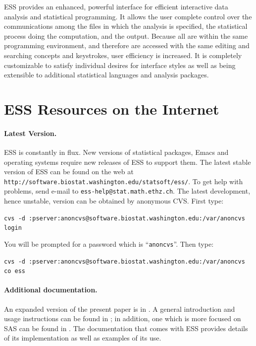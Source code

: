 \documentclass{article}
\def\url#1{\stexttt{#1}} %
\newcommand{\stexttt}[1]{{\small\texttt{#1}}}
\begin{document}
ESS provides 
an enhanced, powerful interface for efficient interactive data
analysis and statistical programming.  
It allows the user complete control over the communications among the
files in which the analysis is specified, the statistical process doing
the computation, and the output.  Because all are within the same programming
environment, and therefore are accessed with the same
editing and searching concepts and keystrokes, user efficiency is increased.
It is completely customizable
to satisfy individual desires for interface styles as well as being
extensible to additional statistical languages and analysis packages.


\section*{ESS Resources on the Internet}
\label{sec:access}
\paragraph{Latest Version.}
ESS is constantly in flux.  New versions of statistical
packages, Emacs and operating systems require new releases of ESS to
support them.  The latest stable version of ESS can be found on the web at
\url{http://software.biostat.washington.edu/statsoft/ess/}.  To get help
with problems, send e-mail to \url{ess-help@stat.math.ethz.ch}.
The latest development, hence unstable, version can be obtained by
anonymous CVS.  First type:

  \stexttt{cvs -d :pserver:anoncvs@software.biostat.washington.edu:/var/anoncvs login}

  You will be prompted for a password which is ``\stexttt{anoncvs}''.  Then type: 

  \stexttt{cvs -d :pserver:anoncvs@software.biostat.washington.edu:/var/anoncvs co ess}
  

\paragraph{Additional documentation.} An expanded version of
the present paper is in
\citep{RMHHS:2001}.  A general introduction and usage instructions can
be found in \citep{heiberger:dsc:2001}; in addition, one which is more
focused on SAS can be found in \citep{heiberger:philasugi:2001}.  The
documentation that comes with ESS provides details of its
implementation as well as examples of its use.




\end{document}
